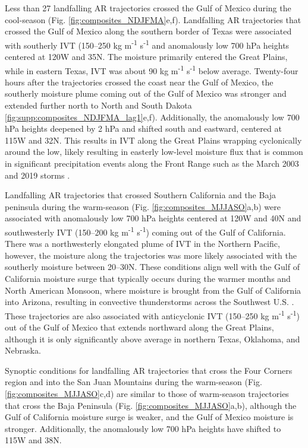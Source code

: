 \documentclass[draft]{agujournal2019}
\begin{document}
Less than 27 landfalling AR trajectories crossed the Gulf of Mexico during the cool-season (Fig. \ref{fig:composites_NDJFMA}e,f). Landfalling AR trajectories that crossed the Gulf of Mexico along the southern border of Texas were associated with southerly IVT (150--250 kg m\textsuperscript{-1} s\textsuperscript{-1} and anomalously low 700 hPa heights centered at 120\textdegree W and 35\textdegree N. The moisture primarily entered the Great Plains, while in eastern Texas, IVT was about 90 kg m\textsuperscript{-1} s\textsuperscript{-1} below average. Twenty-four hours after the trajectories crossed the coast near the Gulf of Mexico, the southerly moisture plume coming out of the Gulf of Mexico was stronger and extended further north to North and South Dakota \ref{fig:supp:composites_NDJFMA_lag1}e,f). Additionally, the anomalously low 700 hPa heights deepened by 2 hPa and shifted south and eastward, centered at 115\textdegree W and 32\textdegree N. This results in IVT along the Great Plains wrapping cyclonically around the low, likely resulting in easterly low-level moisture flux that is common in significant precipitation events along the Front Range such as the March 2003 and 2019 storms \cite{Wesley2013Extreme2003, Zou2024A2019}. 

Landfalling AR trajectories that crossed Southern California and the Baja peninsula during the warm-season (Fig. \ref{fig:composites_MJJASO}a,b) were associated with anomalously low 700 hPa heights centered at 120\textdegree W and 40\textdegree N and southwesterly IVT (150--200 kg m\textsuperscript{-1} s\textsuperscript{-1}) coming out of the Gulf of California. There was a northwesterly elongated plume of IVT in the Northern Pacific, however, the moisture along the trajectories was more likely associated with the southerly moisture between 20--30\textdegree N. These conditions align well with the Gulf of California moisture surge that typically occurs during the warmer months and North American Monsoon, where moisture is brought from the Gulf of California into Arizona, resulting in convective thunderstorms across the Southwest U.S. \cite{Higgins2004RelationshipsStates}. These trajectories are also associated with anticyclonic IVT (150--250 kg m\textsuperscript{-1} s\textsuperscript{-1}) out of the Gulf of Mexico that extends northward along the Great Plains, although it is only significantly above average in northern Texas, Oklahoma, and Nebraska. 

Synoptic conditions for landfalling AR trajectories that cross the Four Corners region and into the San Juan Mountains during the warm-season (Fig. \ref{fig:composites_MJJASO}c,d) are similar to those of warm-season trajectories that cross the Baja Peninsula (Fig. \ref{fig:composites_MJJASO}a,b), although the Gulf of California moisture surge is weaker, and the Gulf of Mexico moisture is stronger. Additionally, the anomalously low 700 hPa heights have shifted to 115\textdegree W and 38\textdegree N. 
\end{document}
